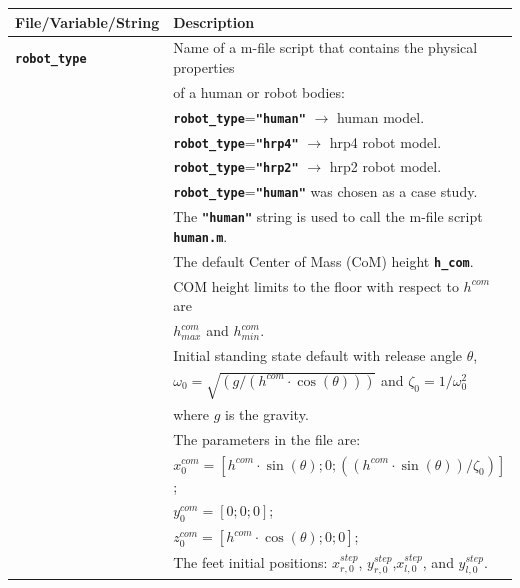 \documentclass[12pt,oneside,notitlepage,abstracton,a4paper]{scrartcl}
\begin{document}
\begin{table}[!htbp] 
\begin{center}
\begin{tabular}{|l|l|}
  \hline
  \rowcolor{green!25}\bf {\small File/Variable/String}      & \bf {\small Description}  \\ \hline 
  \textbf{\texttt{robot\_type}}          &Name of a m-file script that contains the physical properties \\   
             &of a human or robot bodies:\\  
             & \textbf{\texttt{robot\_type}}=\textbf{\texttt{"human"}} $\rightarrow$ human model.\\
             & \textbf{\texttt{robot\_type}}=\textbf{\texttt{"hrp4"}} $\rightarrow$ hrp4 robot model.\\
             & \textbf{\texttt{robot\_type}}=\textbf{\texttt{"hrp2"}} $\rightarrow$ hrp2 robot model.\\
             & \textbf{\texttt{robot\_type}}=\textbf{\texttt{"human"}}  was chosen as a case study.\\  
             & The \textbf{\texttt{"human"}} string is used to call the m-file script \textbf{\texttt{human.m}}.\\   
             & The default Center of Mass (CoM) height \textbf{\texttt{h\_com}}.\\  
             & COM height limits to the floor with respect to \textbf{\texttt{$h^{com}$}} are\\  
             & \textbf{\texttt{$h^{com}_{max}$}} and \textbf{\texttt{$h^{com}_{min}$}}.\\    
             & Initial standing state default with release angle \textbf{\texttt{$\theta$}}, \\  
             & \textbf{\texttt{$\omega_0=\sqrt{(g/(h^{com}\cdot \cos(\theta)))}$}} and $\zeta_0=1/\omega_0^2$\\  
             & where \textbf{\texttt{$g$}} is the gravity.\\     
             & The parameters in the file are:\\ 
             & \textbf{\texttt{$x_0^{com}=[h^{com}\cdot \sin(\theta);0;((h^{com}\cdot \sin(\theta))/\zeta_0)]$}};\\     
             & \textbf{\texttt{$y_0^{com}=[0;0;0]$}};\\   
             & \textbf{\texttt{$z_0^{com}=[h^{com}\cdot \cos(\theta);0;0]$}};\\     
             & The feet initial positions:  \textbf{\texttt{$x^{step}_{r,0}$}}, \textbf{\texttt{$y^{step}_{r,0}$}},\textbf{\texttt{$x^{step}_{l,0}$}}, and \textbf{\texttt{$y^{step}_{l,0}$}}.\\         

\end{tabular}
\end{center}
\end{table}
\end{document}
